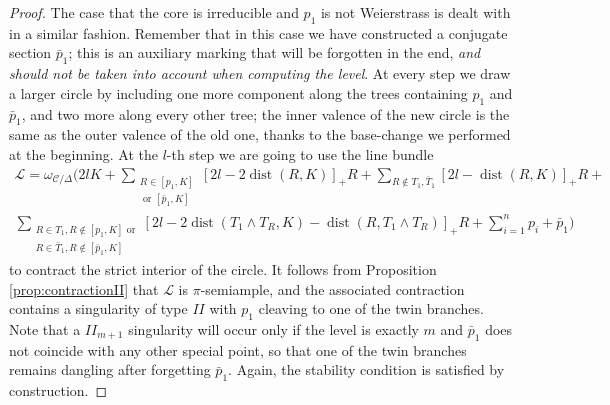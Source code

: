 \documentclass[11pt]{amsart}
\newcommand{\dvr}{\Delta}
\newcommand{\dist}{\operatorname{dist}}
\theoremstyle{plain}
\theoremstyle{definition}
\begin{document}
\begin{proof}
  The case that the core is irreducible and $p_1$ is not Weierstrass is dealt with in a similar fashion. Remember that in this case we have constructed a conjugate section $\bar p_1$; this is an auxiliary marking that will be forgotten in the end, \emph{and should not be taken into account when computing the level}. At every step we draw a larger circle by including one more component along the trees containing $p_1$ and $\bar p_1$, and two more along every other tree; the inner valence of the new circle is the same as the outer valence of the old one, thanks to the base-change we performed at the beginning. At the $l$-th step we are going to use the line bundle
  \begin{multline*}
  \mathcal L=\omega_{\mathcal C/\dvr}(2l K + \sum_{\substack{R\in [p_1,K]\\ \text{ or }[\bar p_1,K]}}[2l-2\dist(R,K)]_+R +\sum_{R\notin T_1,\bar T_1}[2l-\dist(R,K)]_+R +\\
  \sum_{\substack{R\in T_1,R\notin [p_1,K]\text{ or} \\ R\in \bar T_1,R\notin [\bar p_1,K]}}[2l-2\dist(T_1\wedge T_R,K)-\dist(R,T_1\wedge T_R)]_+R+ \sum_{i=1}^np_i+\bar p_1)
  \end{multline*}
  to contract the strict interior of the circle. It follows from Proposition \ref{prop:contractionII} that $\mathcal L$ is $\pi$-semiample, and the associated contraction contains a singularity of type $I\!I$ with $p_1$ cleaving to one of the twin branches. Note that a $I\!I_{m+1}$ singularity will occur only if the level is exactly $m$ and $\bar p_1$ does not coincide with any other special point, so that one of the twin branches remains dangling after forgetting $\bar p_1$. Again, the stability condition is satisfied by construction.
  
  \smallskip
  

\end{proof}
\end{document}
